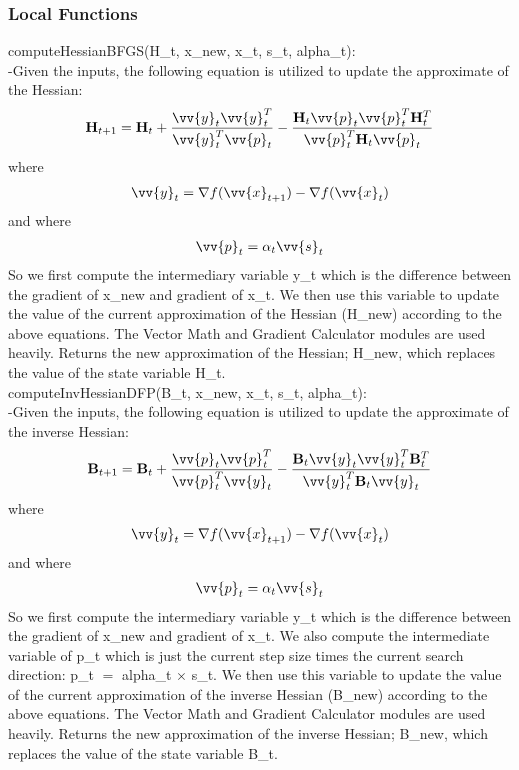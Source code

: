 \documentclass[12pt, titlepage]{article}
\begin{document}
\subsubsection{Local Functions}

\noindent computeHessianBFGS(H\_t, x\_new, x\_t, s\_t, alpha\_t):
\\

\noindent -Given the inputs, the following equation is utilized to update the approximate of the Hessian:
\begin{align*}
    \mathbf{H}_{t+1} = \mathbf{H}_{t} + \frac{\vv{y}_{t}\vv{y}_{t}^{T}}{\vv{y}_{t}^{T}\vv{p}_{t}} - \frac{ \mathbf{H}_{t}\vv{p}_{t}\vv{p}_{t}^{T}\mathbf{H}_{t}^{T} }{ \vv{p}_{t}^{T}\mathbf{H}_{t}\vv{p}_{t} }
\end{align*}
where 
\begin{align*}
    \vv{y}_{t} = \nabla f(\vv{x}_{t+1}) - \nabla f(\vv{x}_{t})
\end{align*}
and where 
\begin{align*}
    \vv{p}_t = \alpha_{t}\vv{s}_t
\end{align*}
So we first compute the intermediary variable y\_t which is the difference between the gradient of x\_new and gradient of x\_t. We then use this variable to update the value of the current approximation of the Hessian (H\_new) according to the above equations. The Vector Math and Gradient Calculator modules are used heavily. Returns the new approximation of the Hessian; H\_new, which replaces the value of the state variable H\_t.
\\

\noindent computeInvHessianDFP(B\_t, x\_new, x\_t, s\_t, alpha\_t):
\\

\noindent -Given the inputs, the following equation is utilized to update the approximate of the inverse Hessian:
\begin{align*}
    \mathbf{B}_{t+1} = \mathbf{B}_{t} + \frac{\vv{p}_{t}\vv{p}_{t}^{T}}{\vv{p}_{t}^{T}\vv{y}_{t}} - \frac{ \mathbf{B}_{t}\vv{y}_{t}\vv{y}_{t}^{T}\mathbf{B}_{t}^{T} }{ \vv{y}_{t}^{T}\mathbf{B}_{t}\vv{y}_{t} }
\end{align*}
where 
\begin{align*}
    \vv{y}_{t} = \nabla f(\vv{x}_{t+1}) - \nabla f(\vv{x}_{t})
\end{align*}
and where 
\begin{align*}
    \vv{p}_t = \alpha_{t}\vv{s}_t
\end{align*}
So we first compute the intermediary variable y\_t which is the difference between the gradient of x\_new and gradient of x\_t. We also compute the intermediate variable of p\_t which is just the current step size times the current search direction: p\_t $=$ alpha\_t $\times$ s\_t. We then use this variable to update the value of the current approximation of the inverse Hessian (B\_new) according to the above equations. The Vector Math and Gradient Calculator modules are used heavily. Returns the new approximation of the inverse Hessian; B\_new, which replaces the value of the state variable B\_t.
\end{document}
